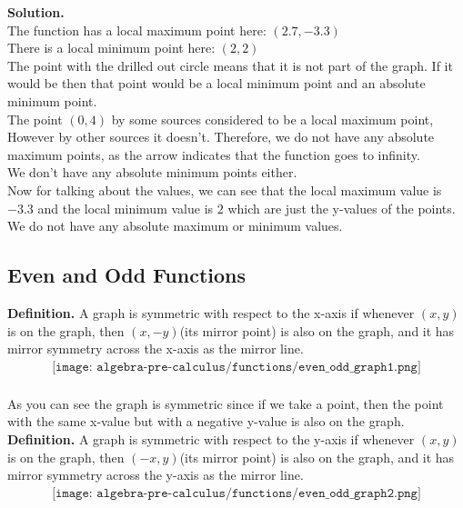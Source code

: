 \textbf{Solution.} \\
The function has a local maximum point here: $(2.7,-3.3)$ \\
There is a local minimum point here: $(2, 2)$ \\
The point with the drilled out circle means that it is not part of the graph. If it would be then that point would be a local minimum point and an absolute minimum point. \\ 
The point $(0,4)$ by some sources considered to be a local maximum point, However by other sources it doesn't. 
Therefore, we do not have any absolute maximum points, as the arrow indicates that the function goes to infinity. \\
We don't have any absolute minimum points either. \\
Now for talking about the values, we can see that the local maximum value is $-3.3$ and the local minimum value is $2$ which are just the y-values of the points. \\
We do not have any absolute maximum or minimum values.

\subsection{Even and Odd Functions}
\textbf{Definition.} A graph is symmetric with respect to the x-axis if whenever $(x,y)$ is on the graph, then $(x,-y)$(its mirror point) is also on the graph, and it has mirror symmetry across the x-axis as the mirror line. \\
\begin{align*}
	\texttt{[image: algebra-pre-calculus/functions/even\_odd\_graph1.png]} \\
\end{align*}

As you can see the graph is symmetric since if we take a point, then the point with the same x-value but with a negative y-value is also on the graph. \\
\textbf{Definition.} A graph is symmetric with respect to the y-axis if whenever $(x,y)$ is on the graph, then $(-x,y)$(its mirror point) is also on the graph, and it has mirror symmetry across the y-axis as the mirror line. \\

\begin{align*}
	\texttt{[image: algebra-pre-calculus/functions/even\_odd\_graph2.png]} \\
\end{align*}

